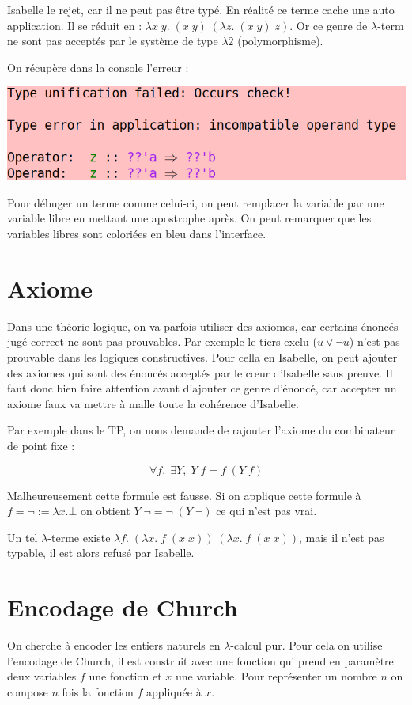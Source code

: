 \documentclass{article}
\theoremstyle{plain}
\begin{document}
  Isabelle le rejet, car il ne peut pas être typé. En réalité ce terme cache une
  auto application. Il se réduit en :
  $\lambda x\;y.\;(x\;y)\;(\lambda z.\; (x\;y)\;z)$. Or ce genre
  de $\lambda$-term ne sont pas acceptés par le système de type $\lambda2$
  (polymorphisme).

  On récupère dans la console l'erreur :
  \begin{center}
    \includegraphics[scale=0.5]{error.png}
  \end{center}

  Pour débuger un terme comme celui-ci, on peut remplacer la variable par une
  variable libre en mettant une apostrophe après. On peut remarquer que les
  variables libres sont coloriées en bleu dans l'interface.

  \section{Axiome}
    Dans une théorie logique, on va parfois utiliser des axiomes, car certains
    énoncés jugé correct ne sont pas prouvables. Par exemple le tiers exclu ($u
    \vee \neg u$) n'est pas prouvable dans les logiques constructives. Pour
    cella en Isabelle, on peut ajouter des axiomes qui sont des énoncés acceptés
    par le c\oe{}ur d'Isabelle sans preuve. Il faut donc bien faire attention
    avant d'ajouter ce genre d'énoncé, car accepter un axiome faux va mettre à
    malle toute la cohérence d'Isabelle.

    Par exemple dans le TP, on nous demande de rajouter l'axiome du combinateur
    de point fixe :

    $$\forall f,\;\exists Y,\; Y\;f = f\;(Y\;f)$$

    Malheureusement cette formule est fausse. Si on applique cette formule à $f
    = \neg := \lambda x. \bot$ on obtient $Y\;\neg = \neg\;(Y\;\neg)$ ce qui
    n'est pas vrai.

    Un tel $\lambda$-terme existe $\lambda f.\;(\lambda x.\;f\;(x\;x))\;
    (\lambda x.\;f\;(x\;x))$, mais il n'est pas typable, il est alors refusé par
    Isabelle.

  \section{Encodage de Church}
    On cherche à encoder les entiers naturels en $\lambda$-calcul pur. Pour cela
    on utilise l'encodage de Church, il est construit avec une fonction qui
    prend en paramètre deux variables $f$ une fonction et $x$ une variable. Pour
    représenter un nombre $n$ on compose $n$ fois la fonction $f$ appliquée
    à $x$.
\end{document}
